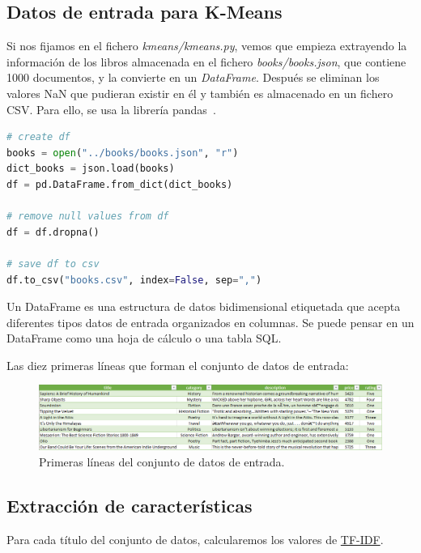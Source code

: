 \documentclass{uimppracticas}
\begin{document}
\subsection{Datos de entrada para K-Means}

Si nos fijamos en el fichero \textit{kmeans/kmeans.py}, vemos que empieza extrayendo la información de los libros almacenada en el fichero \textit{books/books.json}, que contiene 1000 documentos, y la convierte en un \textit{DataFrame}. Después se eliminan los valores NaN que pudieran existir en él y también es almacenado en un fichero CSV. Para ello, se usa la librería pandas~\cite{jeff_reback_2020_4309786}.

\begin{lstlisting}[language=python]
# create df
books = open("../books/books.json", "r")
dict_books = json.load(books)
df = pd.DataFrame.from_dict(dict_books)

# remove null values from df
df = df.dropna()

# save df to csv
df.to_csv("books.csv", index=False, sep=",")
\end{lstlisting}

\begin{definition}
Un DataFrame es una estructura de datos bidimensional etiquetada que acepta diferentes tipos datos de entrada organizados en columnas. Se puede pensar en un DataFrame como una hoja de cálculo o una tabla SQL.
\end{definition}

Las diez primeras líneas que forman el conjunto de datos de entrada:

\begin{figure}[h]
	\includegraphics[scale=0.55]{images/data}
	\caption{Primeras líneas del conjunto de datos de entrada.}
	\label{data}
\end{figure}

\subsection{Extracción de características}

Para cada título del conjunto de datos, calcularemos los valores de \href{https://es.wikipedia.org/wiki/Tf-idf}{TF-IDF}.
\end{document}
